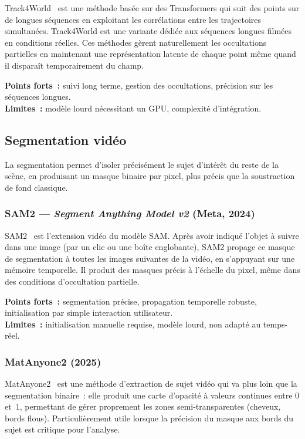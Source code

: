 Track4World~\cite{karaev2023cotracker} est une méthode basée sur des Transformers qui suit des points sur de longues séquences en exploitant les corrélations entre les trajectoires simultanées. Track4World est une variante dédiée aux séquences longues filmées en conditions réelles. Ces méthodes gèrent naturellement les occultations partielles en maintenant une représentation latente de chaque point même quand il disparaît temporairement du champ.

\medskip
\noindent\textbf{Points forts~:} suivi long terme, gestion des occultations, précision sur les séquences longues.\\
\textbf{Limites~:} modèle lourd nécessitant un GPU, complexité d'intégration.

\subsection{Segmentation vidéo}

La segmentation permet d'isoler précisément le sujet d'intérêt du reste de la scène, en produisant un masque binaire par pixel, plus précis que la soustraction de fond classique.

\subsubsection{SAM2 --- \textit{Segment Anything Model v2} (Meta, 2024)}

SAM2~\cite{ravi2024sam2} est l'extension vidéo du modèle SAM. Après avoir indiqué l'objet à suivre dans une image (par un clic ou une boîte englobante), SAM2 propage ce masque de segmentation à toutes les images suivantes de la vidéo, en s'appuyant sur une mémoire temporelle. Il produit des masques précis à l'échelle du pixel, même dans des conditions d'occultation partielle.

\medskip
\noindent\textbf{Points forts~:} segmentation précise, propagation temporelle robuste, initialisation par simple interaction utilisateur.\\
\textbf{Limites~:} initialisation manuelle requise, modèle lourd, non adapté au temps-réel.

\subsubsection{MatAnyone2 (2025)}

MatAnyone2~\cite{ye2025matanyone} est une méthode d'extraction de sujet vidéo qui va plus loin que la segmentation binaire~: elle produit une carte d'opacité à valeurs continues entre 0 et~1, permettant de gérer proprement les zones semi-transparentes (cheveux, bords flous). Particulièrement utile lorsque la précision du masque aux bords du sujet est critique pour l'analyse.

